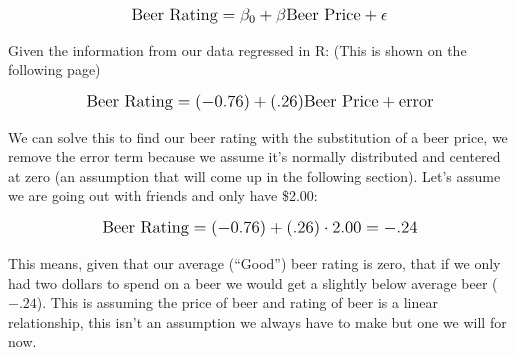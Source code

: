 \documentclass[12pt]{article}\usepackage[]{graphicx}\usepackage[]{color}
\begin{document}
\begin{flushleft}
\begin{equation}
\mathlarger{ \text{Beer Rating} = \beta_0 + \beta \text{Beer Price} + \epsilon }
\end{equation}

\noindent Given the information from our data regressed in R: (This is shown on the following page)

\begin{equation}
\mathlarger{ \text{Beer Rating} =  (-0.76) + (.26) \text{Beer Price} + \text{error} }
\end{equation}

We can solve this to find our beer rating with the substitution of a beer price, we remove the error term because we assume it's normally distributed and centered at zero (an assumption that will come up in the following section). Let's assume we are going out with friends and only have \$2.00:

\begin{equation}
\mathlarger{  \text{Beer Rating} = (-0.76)+(.26)\cdot 2.00 = -.24 }
\end{equation}

This means, given that our average (``Good'') beer rating is zero, that if we only had two dollars to spend on a beer we would get a slightly below average beer ($-.24$). This is assuming the price of beer and rating of beer is a linear relationship, this isn't an assumption we always have to make but one we will for now.


\end{flushleft}
\end{document}
